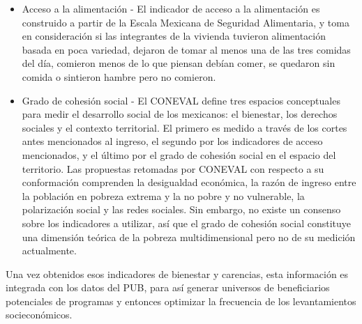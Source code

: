 \begin{itemize}
    \item Acceso a la alimentación - El indicador de acceso a la alimentación es construido a partir de la Escala Mexicana de Seguridad Alimentaria, y toma en consideración si las integrantes de la vivienda tuvieron alimentación basada en poca variedad, dejaron de tomar al menos una de las tres comidas del día, comieron menos de lo que piensan debían comer, se quedaron sin comida o sintieron hambre pero no comieron.
    \item Grado de cohesión social - El CONEVAL define tres espacios conceptuales para medir el desarrollo social de los mexicanos: el bienestar, los derechos sociales y el contexto territorial. El primero es medido a través de los cortes antes mencionados al ingreso, el segundo por los indicadores de acceso mencionados, y el último por el grado de cohesión social en el espacio del territorio. Las propuestas retomadas por CONEVAL con respecto a su conformación comprenden la desigualdad económica, la razón de ingreso entre la población en pobreza extrema y la no pobre y no vulnerable, la polarización social y las redes sociales. Sin embargo, no existe un consenso sobre los indicadores a utilizar, así que el grado de cohesión social constituye una dimensión teórica de la pobreza multidimensional pero no de su medición actualmente.
\end{itemize}
Una vez obtenidos esos indicadores de bienestar y carencias, esta información es integrada con los datos del PUB, para así generar universos de beneficiarios potenciales de programas y entonces optimizar la frecuencia de los levantamientos socieconómicos.

